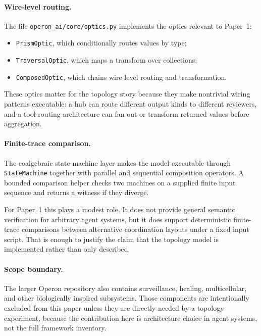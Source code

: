 \paragraph{Wire-level routing.}
The file \texttt{operon\_ai/core/optics.py} implements the optics relevant to Paper~1:
\begin{itemize}[leftmargin=*]
\item \texttt{PrismOptic}, which conditionally routes values by type;
\item \texttt{TraversalOptic}, which maps a transform over collections;
\item \texttt{ComposedOptic}, which chains wire-level routing and transformation.
\end{itemize}
These optics matter for the topology story because they make nontrivial wiring patterns executable: a
hub can route different output kinds to different reviewers, and a tool-routing architecture can fan out
or transform returned values before aggregation.

\paragraph{Finite-trace comparison.}
The coalgebraic state-machine layer makes the model executable through \texttt{StateMachine} together
with parallel and sequential composition operators. A bounded comparison helper checks two machines on a
supplied finite input sequence and returns a witness if they diverge.

For Paper~1 this plays a modest role. It does not provide general semantic verification for arbitrary
agent systems, but it does support deterministic finite-trace comparisons between alternative
coordination layouts under a fixed input script. That is enough to justify the claim that the topology
model is implemented rather than only described.

\paragraph{Scope boundary.}
The larger Operon repository also contains surveillance, healing, multicellular, and other biologically
inspired subsystems. Those components are intentionally excluded from this paper unless they are directly
needed by a topology experiment, because the contribution here is architecture choice in agent systems,
not the full framework inventory.

